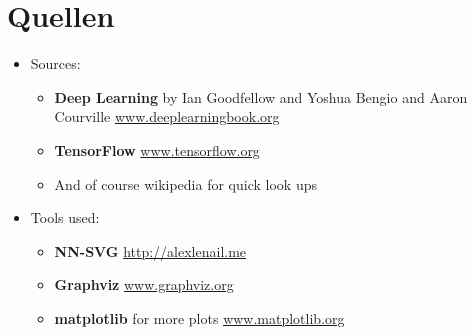 \documentclass[t]{beamer}
\begin{document}
\section{Quellen}
\begin{frame}
    \begin{itemize}
        \item Sources:
        \begin{itemize}
            \item \textbf{Deep Learning} by Ian Goodfellow and Yoshua Bengio and Aaron Courville \newline
            \href{https://www.deeplearningbook.org}{www.deeplearningbook.org}
            \item \textbf{TensorFlow} \newline
            \href{https://www.tensorflow.org}{www.tensorflow.org}
            \item And of course wikipedia for quick look ups \newline
            
        \end{itemize}
        \item Tools used:
        \begin{itemize}
            \item \textbf{NN-SVG} \newline
            \href{http://alexlenail.me/NN-SVG/index.html}{http://alexlenail.me}
            \item \textbf{Graphviz} \newline
            \href{https://graphviz.org}{www.graphviz.org}
            \item \textbf{matplotlib} for more plots \newline
            \href{https://matplotlib.org}{www.matplotlib.org}
        \end{itemize}
    \end{itemize}
\end{frame}
\end{document}
